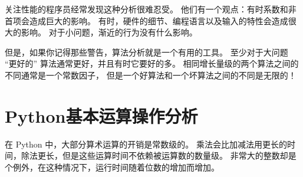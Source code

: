 
关注性能的程序员经常发现这种分析很难忍受。  他们有一个观点：有时系数和非首项会造成巨大的影响。  有时，硬件的细节、编程语言以及输入的特性会造成很大的影响。  对于小问题，渐近的行为没有什么影响。


但是，如果你记得那些警告，算法分析就是一个有用的工具。
至少对于大问题 ``更好的'' 算法通常更好，并且有时它要好的多。
相同增长量级的两个算法之间的不同通常是一个常数因子，
但是一个好算法和一个坏算法之间的不同是无限的！


\section{Python基本运算操作分析}


在 Python 中，大部分算术运算的开销是常数级的。
乘法会比加减法用更长的时间，除法更长，但是这些运算时间不依赖被运算数的数量级。
非常大的整数却是个例外，在这种情况下，运行时间随着位数的增加而增加。


